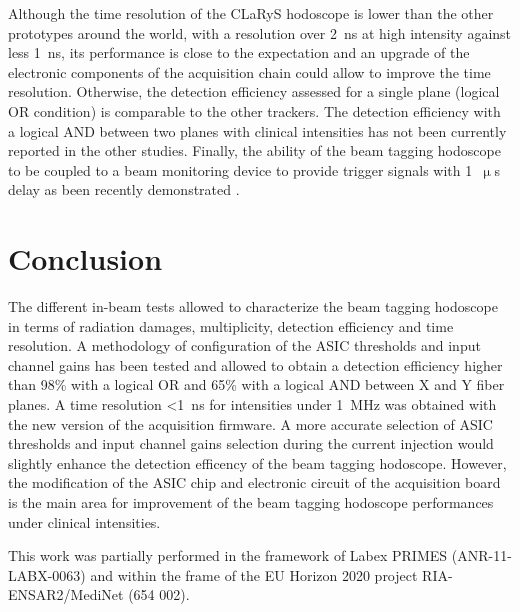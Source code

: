 \documentclass[a4paper,11pt]{article}
\begin{document}
Although the time resolution of the CLaRyS hodoscope is lower than the other prototypes around the world, with a resolution over 2~ns at high intensity against less 1~ns, its performance is close to the expectation and an upgrade of the electronic components of the acquisition chain could allow to improve the time resolution. Otherwise, the detection efficiency assessed for a single plane (logical OR condition) is comparable to the other trackers. The detection efficiency with a logical AND between two planes with clinical intensities has not been currently reported in the other studies. Finally, the ability of the beam tagging hodoscope to be coupled to a beam monitoring device to provide trigger signals with 1~$\upmu$s delay as been recently demonstrated \cite{Chen2019}.


\section{Conclusion}

The different in-beam tests allowed to characterize the beam tagging hodoscope in terms of radiation damages, multiplicity, detection efficiency and time resolution. A methodology of configuration of the ASIC thresholds and input channel gains has been tested and allowed to obtain a detection efficiency higher than 98\% with a logical OR and 65\% with a logical AND between X and Y fiber planes. A time resolution <1~ns for intensities under 1~MHz was obtained with the new version of the acquisition firmware. A more accurate selection of ASIC thresholds and input channel gains selection during the current injection would slightly enhance the detection efficency of the beam tagging hodoscope. However, the modification of the ASIC chip and electronic circuit of the acquisition board is the main area for improvement of the beam tagging hodoscope performances under clinical intensities.






\acknowledgments
This work was partially performed in the framework of Labex PRIMES (ANR-11-LABX-0063) and within the frame of the EU Horizon 2020 project RIA-ENSAR2/MediNet (654 002).  

\end{document}
